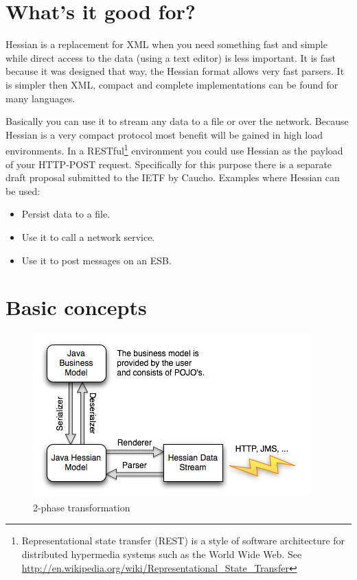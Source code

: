 \documentclass[a4paper]{article}
\begin{document}
\section{What's it good for?}

Hessian is a replacement for XML when you need something fast and simple while direct access to the data (using a text editor) is less important. It is fast because it was designed that way, the Hessian format allows very fast parsers. It is simpler then XML, compact and complete implementations can be found for many languages. 

Basically you can use it to stream any data to a file or over the network. Because Hessian is a very compact protocol most benefit will be gained in high load environments. In a RESTful\footnote{Representational state transfer (REST) is a style of software architecture for distributed hypermedia systems such as the World Wide Web. See \url{http://en.wikipedia.org/wiki/Representational_State_Transfer}} environment you could use Hessian as the payload of your HTTP-POST request. Specifically for this purpose there is a separate draft proposal submitted to the IETF by Caucho. Examples where Hessian can be used:

\begin{itemize}
   \item Persist data to a file. 
   \item Use it to call a network service.
   \item Use it to post messages on an ESB.
\end{itemize}

\section{Basic concepts}

\smallskip
\begin{figure}[htp]
\centering
\includegraphics[scale=0.8]{concept.png}
\caption{2-phase transformation}
\label{fig:concept}
\end{figure}
\smallskip
\end{document}
